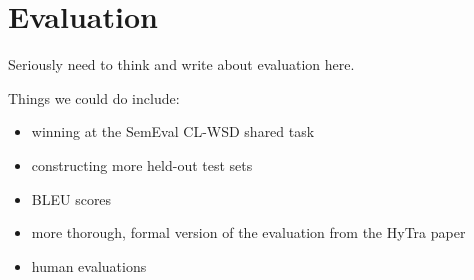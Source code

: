 \section{Evaluation}

Seriously need to think and write about evaluation here.

Things we could do include:

\begin{itemize}
\item winning at the SemEval CL-WSD shared task
\item constructing more held-out test sets
\item BLEU scores
\item more thorough, formal version of the evaluation from the HyTra paper
\item human evaluations
\end{itemize}

